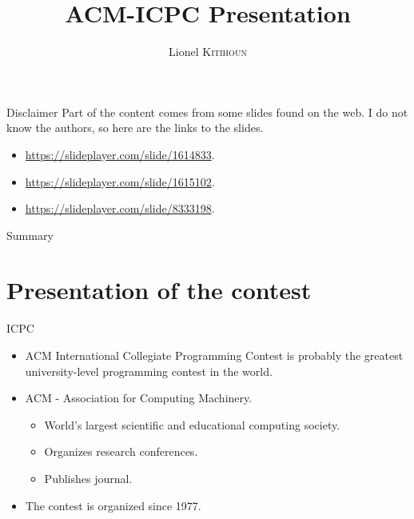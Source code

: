 \documentclass{beamer}
\title{ACM-ICPC Presentation}
\author{Lionel \textsc{Kitihoun}}
\date{}
\begin{document}
\begin{frame}[plain]
    \maketitle
\end{frame}

\begin{frame}{Disclaimer}
Part of the content comes from some slides found on the web. I do not know the authors, so here are the links to the slides.

\begin{itemize}
  \item \url{https://slideplayer.com/slide/1614833}.
  \item \url{https://slideplayer.com/slide/1615102}.
  \item \url{https://slideplayer.com/slide/8333198}.
\end{itemize}
\end{frame}

\begin{frame}{Summary}
  \tableofcontents
\end{frame}

\section{Presentation of the contest}

\begin{frame}{ICPC}
\begin{itemize}
  \justifying
  \item ACM International Collegiate Programming Contest is probably the greatest university-level programming contest in the world.
  \item ACM - Association for Computing Machinery.
  \begin{itemize}
    \justifying
    \item World's largest scientific and educational computing society.
    \item Organizes research conferences.
    \item Publishes journal.
  \end{itemize}
  \item The contest is organized since 1977.
\end{itemize}
\end{frame}
\end{document}
